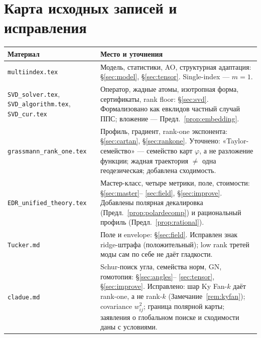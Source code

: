 \documentclass[11pt,a4paper]{article}
\theoremstyle{remark}
\begin{document}
\section{Карта исходных записей и исправления}
\begin{center}\small
\begin{tabularx}{\linewidth}{@{}p{36mm}L@{}}
\toprule
Материал & Место и уточнения\\
\midrule
\texttt{multiindex.tex} &
Модель, статистики, AO, структурная адаптация: §\ref{sec:model},
§\ref{sec:tensor}. Single-index --- $m=1$.\\
\texttt{SVD\_solver.tex}, \texttt{SVD\_algorithm.tex}, \texttt{SVD\_cur.tex} &
Оператор, жадные атомы, изотропная форма, сертификаты, rank floor:
§\ref{sec:svd}. Формализовано как евклидов частный случай ППС;
вложение --- Предл.~\ref{prop:embedding}.\\
\texttt{grassmann\_rank\_one.tex} &
Профиль, градиент, rank-one экспонента: §\ref{sec:cartan}, §\ref{sec:rankone}.
Уточнено: «Taylor-семейство» --- семейство карт $\varphi$, а не разложение
функции; жадная траектория $\ne$ одна геодезическая; добавлена сходимость.\\
\texttt{EDR\_unified\_theory.tex} &
Мастер-класс, четыре метрики, поле, стоимости: §\ref{sec:master}--%
\ref{sec:field}, §\ref{sec:improve}. Добавлены полярная декалировка
(Предл.~\ref{prop:polardecomp}) и рациональный профиль
(Предл.~\ref{prop:rational}).\\
\texttt{Tucker.md} &
Поле и envelope: §\ref{sec:field}. Исправлен знак ridge-штрафа
(положительный); low rank третей моды сам по себе не даёт гладкости.\\
\texttt{cladue.md} &
Schur-поиск угла, семейства норм, GN, гомотопия: §\ref{sec:angles}--%
\ref{sec:tensor}, §\ref{sec:improve}. Исправлено: шар Ky Fan-$k$ даёт
rank-one, а не rank-$k$ (Замечание~\ref{rem:kyfan}); covariance
 $w_{ij}^2$; граница полярной карты; заявления о глобальном поиске и
сходимости даны с условиями.\\
\bottomrule
\end{tabularx}
\end{center}
\end{document}
